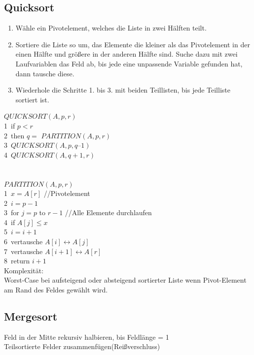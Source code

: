 \documentclass[10pt,a4paper]{scrartcl}
\begin{document}
\subsection{Quicksort}
\begin{enumerate}
	\item Wähle ein Pivotelement, welches die Liste in zwei Hälften teilt. 
	\item Sortiere die Liste so um, das Elemente die kleiner als das Pivotelement in der einen Hälfte und größere in der anderen Hälfte sind. 
		Suche dazu mit zwei Laufvariablen das Feld ab, bis jede eine unpassende Variable gefunden hat, dann tausche diese.
	\item Wiederhole die Schritte 1. bis 3. mit beiden Teillisten, bis jede Teilliste sortiert ist.
\end{enumerate}
	

$QUICKSORT (A, p, r)$\\
1\ if $p < r$\\
2\ then $q =$ $PARTITION ( A, p, r)$\\
3\ $QUICKSORT (A, p, q – 1)$\\
4\ $QUICKSORT (A, q + 1, r)$\\
\\
\\
$PARTITION(A, p, r)$\\
1\ $x = A[r]$ //Pivotelement\\
2\ $i = p-1$ \\
3\ for $j = p$ to $r - 1$ //Alle Elemente durchlaufen\\
4\ \quad if $A[j] \le x$\\
5\ \qquad $i = i+1$\\
6\ \qquad vertausche $A[i] \leftrightarrow A[j]$\\
7\ vertausche $A[i + 1] \leftrightarrow A[r]$\\
8\ return $i + 1$\\

Komplexität:\\
Worst-Case bei aufsteigend oder absteigend sortierter Liste wenn Pivot-Element am Rand des Feldes gewählt wird.\\

\subsection{Mergesort}
Feld in der Mitte rekursiv halbieren, bis Feldlänge = 1\\
Teilsortierte Felder zusammenfügen(Reißverschluss)\\
\end{document}
